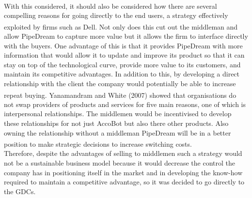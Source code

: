 \documentclass[11pt]{article}		%
\newcommand{\supercite}[1]{\textsuperscript{\cite{#1}}}		%
\begin{document}
    \\
     \hspace*{2ex}With this considered, it should also be considered how there are several compelling reasons for going directly to the end users, a strategy effectively exploited by firms such as Dell\supercite{business_model}. Not only does this cut out the middleman and allow PipeDream to capture more value but it allows the firm to interface directly with the buyers. One advantage of this is that it provides PipeDream with more information that would allow it to update and improve its product so that it can stay on top of the technological curve, provide more value to its customers, and maintain its competitive advantages. In addition to this, by developing a direct relationship with the client the company would potentially be able to increase repeat buying. Yanamandram and White (2007)\supercite{customers} showed that organisations do not swap providers of products and services for five main reasons, one of which is interpersonal relationships. The middlemen would be incentivised to develop these relationships for not just AccoBot but also there other products. Also owning the relationship without a middleman PipeDream will be in a better position to make strategic decisions to increase switching costs.\supercite{B2Brelations}
    \\
    \hspace*{2ex}Therefore, despite the advantages of selling to middlemen such a strategy would not be a sustainable business model because it would decrease the control the company has in positioning itself in the market and in developing the know-how required to maintain a competitive advantage, so it was decided to go directly to the GDCs.


            
\end{document}
